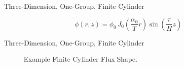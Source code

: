 \begin{frame}{Three-Dimension, One-Group, Finite Cylinder}
  \begin{figure}
    \centering
    \vspace{0.2in}
    \label{fig:circle_meshes}
  \end{figure}

  \vspace{-0.4in}

  \begin{equation}
    \label{eq:analytic_finite_cyl}
    \phi(r,z) = \phi_0 \, 
      J_0\left(\frac{\alpha_0}{T} r\right) \sin\left(\frac{\pi}{H} z \right)
  \end{equation}
\end{frame}

\begin{frame}{Three-Dimension, One-Group, Finite Cylinder}
  \begin{figure}
    \centering
    \hspace{0.2in}
    \caption{Example Finite Cylinder Flux Shape.}
    \label{fig:finite_cyl}
  \end{figure}
\end{frame}

